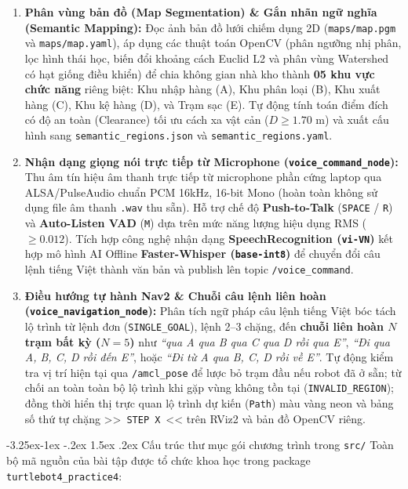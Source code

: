 \documentclass[11pt,a4paper]{article}
\makeatletter
\renewcommand{\subsection}{\@startsection{subsection}{2}{\z@}%
  {-3.25ex\@plus -1ex \@minus -.2ex}%
  {1.5ex \@plus .2ex}%
  {\normalfont\normalsize\bfseries\color{secondary}}}
\makeatother
\begin{document}
\begin{enumerate}
  \item \textbf{Phân vùng bản đồ (Map Segmentation) \& Gắn nhãn ngữ nghĩa (Semantic Mapping):} Đọc ảnh bản đồ lưới chiếm dụng 2D (\texttt{maps/map.pgm} và \texttt{maps/map.yaml}), áp dụng các thuật toán OpenCV (phân ngưỡng nhị phân, lọc hình thái học, biến đổi khoảng cách Euclid L2 và phân vùng Watershed có hạt giống điều khiển) để chia không gian nhà kho thành \textbf{05 khu vực chức năng} riêng biệt: Khu nhập hàng (A), Khu phân loại (B), Khu xuất hàng (C), Khu kệ hàng (D), và Trạm sạc (E). Tự động tính toán điểm đích có độ an toàn (Clearance) tối ưu cách xa vật cản ($D \ge 1.70\text{ m}$) và xuất cấu hình sang \texttt{semantic\_regions.json} và \texttt{semantic\_regions.yaml}.
  \item \textbf{Nhận dạng giọng nói trực tiếp từ Microphone (\texttt{voice\_command\_node}):} Thu âm tín hiệu âm thanh trực tiếp từ microphone phần cứng laptop qua ALSA/PulseAudio chuẩn PCM 16kHz, 16-bit Mono (hoàn toàn không sử dụng file âm thanh \texttt{.wav} thu sẵn). Hỗ trợ chế độ \textbf{Push-to-Talk} (\texttt{SPACE} / \texttt{R}) và \textbf{Auto-Listen VAD} (\texttt{M}) dựa trên mức năng lượng hiệu dụng RMS ($\ge 0.012$). Tích hợp công nghệ nhận dạng \textbf{SpeechRecognition (\texttt{vi-VN})} kết hợp mô hình AI Offline \textbf{Faster-Whisper (\texttt{base-int8})} để chuyển đổi câu lệnh tiếng Việt thành văn bản và publish lên topic \texttt{/voice\_command}.
  \item \textbf{Điều hướng tự hành Nav2 \& Chuỗi câu lệnh liên hoàn (\texttt{voice\_navigation\_node}):} Phân tích ngữ pháp câu lệnh tiếng Việt bóc tách lộ trình từ lệnh đơn (\texttt{SINGLE\_GOAL}), lệnh 2--3 chặng, đến \textbf{chuỗi liên hoàn $N$ trạm bất kỳ ($N=5$)} như \textit{``qua A qua B qua C qua D rồi qua E''}, \textit{``Đi qua A, B, C, D rồi đến E''}, hoặc \textit{``Đi từ A qua B, C, D rồi về E''}. Tự động kiểm tra vị trí hiện tại qua \texttt{/amcl\_pose} để lược bỏ trạm đầu nếu robot đã ở sẵn; từ chối an toàn toàn bộ lộ trình khi gặp vùng không tồn tại (\texttt{INVALID\_REGION}); đồng thời hiển thị trực quan lộ trình dự kiến (\texttt{Path}) màu vàng neon và bảng số thứ tự chặng {\normalfont >>~}\texttt{STEP X}{\normalfont~<<} trên RViz2 và bản đồ OpenCV riêng.
\end{enumerate}

\subsection{Cấu trúc thư mục gói chương trình trong \texttt{src/}}
Toàn bộ mã nguồn của bài tập được tổ chức khoa học trong package \texttt{turtlebot4\_practice4}:
\end{document}
